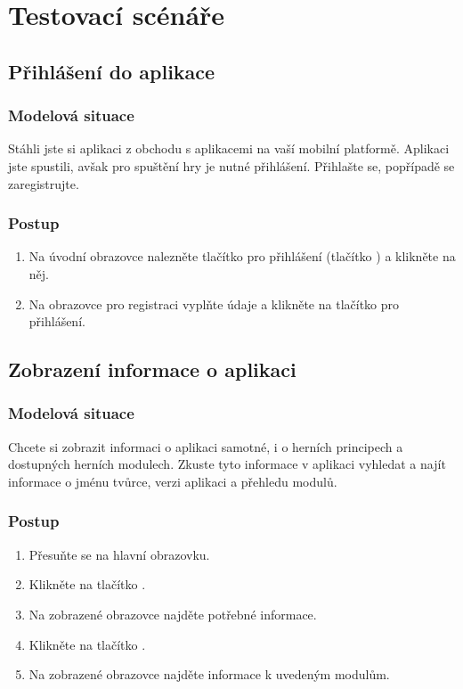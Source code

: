 \chapter{Testovací scénáře}
\label{chap:test-scenarios}

\section{Přihlášení do aplikace}

\subsection*{Modelová situace}

Stáhli jste si aplikaci z obchodu s aplikacemi na vaší mobilní platformě.
Aplikaci jste spustili,
avšak pro spuštění hry je nutné přihlášení.
Přihlašte se, popřípadě se zaregistrujte.

\subsection*{Postup}

\begin{enumerate}
    \item Na úvodní obrazovce nalezněte tlačítko pro přihlášení
    (tlačítko )
    a klikněte na něj.
    \item Na obrazovce pro registraci vyplňte údaje
    a klikněte na tlačítko pro přihlášení.
\end{enumerate}

\section{Zobrazení informace o aplikaci}

\subsection*{Modelová situace}

Chcete si zobrazit informaci o aplikaci samotné,
i o herních principech a dostupných herních modulech.
Zkuste tyto informace v aplikaci vyhledat a najít informace o
jménu tvůrce, verzi aplikaci a přehledu modulů.

\subsection*{Postup}

\begin{enumerate}
    \item Přesuňte se na hlavní obrazovku.
    \item Klikněte na tlačítko .
    \item Na zobrazené obrazovce najděte potřebné informace.
    \item Klikněte na tlačítko .
    \item Na zobrazené obrazovce najděte informace k uvedeným modulům.
\end{enumerate}

